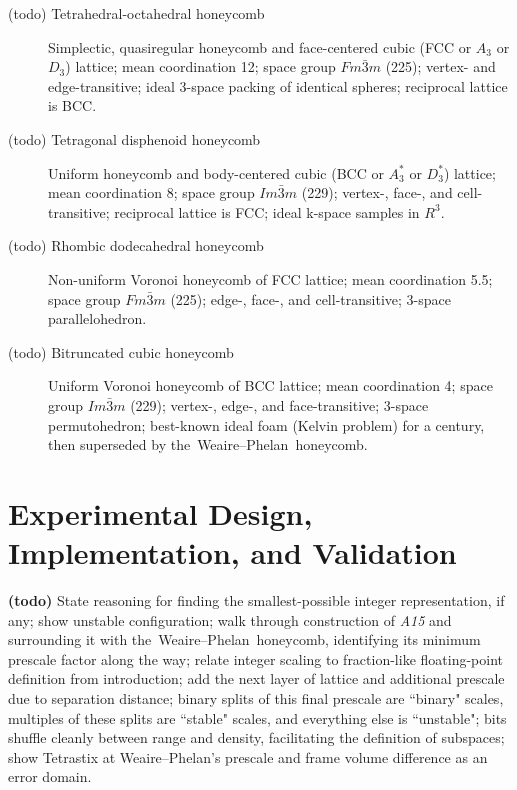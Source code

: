 \documentclass[10pt]{article}
\def\AAAB{\textit{A15}}
\def\TS{Tetrastix} \def\TSP{Tetrastix~Prism} \def\TTSp{The~Tetrastix~prism} \def\tTSp{the~Tetrastix~prism}
\def\WP{Weaire--Phelan} \def\WPH{Weaire--Phelan~Honeycomb} \def\TWPh{The~Weaire--Phelan~honeycomb}
\def\tWPh{the~Weaire--Phelan~honeycomb}
\begin{document}
\begin{description}

  \item[(todo) Tetrahedral-octahedral honeycomb] Simplectic, quasiregular honeycomb and face-centered cubic (FCC or $A_3$ or
    $D_3$) lattice; mean coordination 12; space group $Fm\bar{3}m$ (225); vertex- and edge-transitive; ideal 3-space packing of
    identical spheres; reciprocal lattice is BCC.

  \item[(todo) Tetragonal disphenoid honeycomb] Uniform honeycomb and body-centered cubic (BCC or $A_3^*$ or $D_3^*$) lattice;
    mean coordination 8; space group $Im\bar{3}m$ (229); vertex-, face-, and cell-transitive; reciprocal lattice is FCC; ideal
    k-space samples in $R^3$.

  \item[(todo) Rhombic dodecahedral honeycomb] Non-uniform Voronoi honeycomb of FCC lattice; mean coordination 5.5; space group
    $Fm\bar{3}m$ (225); edge-, face-, and cell-transitive; 3-space parallelohedron.

  \item[(todo) Bitruncated cubic honeycomb] Uniform Voronoi honeycomb of BCC lattice; mean coordination 4; space group
    $Im\bar{3}m$ (229); vertex-, edge-, and face-transitive; 3-space permutohedron; best-known ideal foam (Kelvin problem) for a
    century, then superseded by \tWPh{}.

\end{description}


\section{ Experimental Design, Implementation, and Validation }\label{experimental-design-implementation-and-validation}

\textbf{(todo)} State reasoning for finding the smallest-possible integer representation, if any; show unstable configuration;
walk through construction of \AAAB{} and surrounding it with \tWPh, identifying its minimum prescale factor along the way; relate
integer scaling to fraction-like floating-point definition from introduction; add the next layer of lattice and additional
prescale due to separation distance; binary splits of this final prescale are ``binary" scales, multiples of these splits are
``stable" scales, and everything else is ``unstable"; bits shuffle cleanly between range and density, facilitating the definition
of subspaces; show \TS{} at \WP's prescale and frame volume difference as an error domain.
\end{document}
